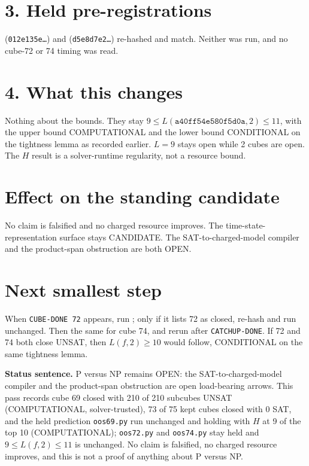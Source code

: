 \documentclass[11pt]{article}
\begin{document}
\section*{3. Held pre-registrations}
 (\texttt{012e135e\ldots}) and  (\texttt{d5e8d7e2\ldots}) re-hashed and match. Neither was run, and no cube-72 or 74 timing was read.

\section*{4. What this changes}
Nothing about the bounds. They stay $9\le L(\texttt{a40ff54e580f5d0a},2)\le 11$, with the upper bound COMPUTATIONAL and the lower bound CONDITIONAL on the tightness lemma as recorded earlier. $L=9$ stays open while 2 cubes are open. The $H$ result is a solver-runtime regularity, not a resource bound.

\section*{Effect on the standing candidate}
No claim is falsified and no charged resource improves. The time-state-representation surface stays CANDIDATE. The SAT-to-charged-model compiler and the product-span obstruction are both OPEN.

\section*{Next smallest step}
When \texttt{CUBE-DONE 72} appears, run ; only if it lists 72 as closed, re-hash and run  unchanged. Then the same for cube 74, and rerun  after \texttt{CATCHUP-DONE}. If 72 and 74 both close UNSAT, then $L(f,2)\ge 10$ would follow, CONDITIONAL on the same tightness lemma.

\bigskip
\noindent\textbf{Status sentence.} P versus NP remains OPEN: the SAT-to-charged-model compiler and the product-span obstruction are open load-bearing arrows. This pass records cube 69 closed with 210 of 210 subcubes UNSAT (COMPUTATIONAL, solver-trusted), 73 of 75 kept cubes closed with 0 SAT, and the held prediction \texttt{oos69.py} run unchanged and holding with $H$ at 9 of the top 10 (COMPUTATIONAL); \texttt{oos72.py} and \texttt{oos74.py} stay held and $9\le L(f,2)\le 11$ is unchanged. No claim is falsified, no charged resource improves, and this is not a proof of anything about P versus NP.
\end{document}
